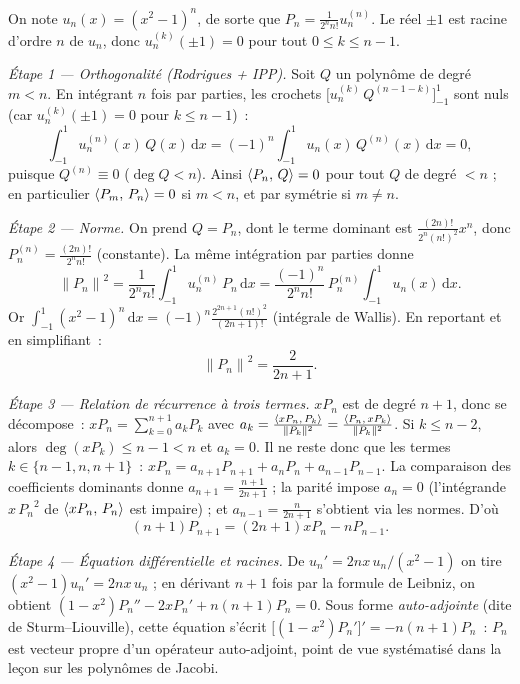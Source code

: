 \begin{mdframed}[style=proofbar]
  On note $u_n(x)={(x^2-1)}^n$, de sorte que $P_n=\frac{1}{2^n n!}u_n^{(n)}$.
  Le réel $\pm 1$ est racine d'ordre $n$ de $u_n$, donc
  $u_n^{(k)}(\pm 1)=0$ pour tout $0\leq k\leq n-1$.

  \medskip
  \textit{Étape 1 — Orthogonalité (Rodrigues + IPP).}
  Soit $Q$ un polynôme de degré $m<n$. En intégrant $n$ fois par parties,
  les crochets $\bigl[u_n^{(k)}\,Q^{(n-1-k)}\bigr]_{-1}^{1}$ sont nuls
  (car $u_n^{(k)}(\pm 1)=0$ pour $k\leq n-1$)~:
  \[
    \int_{-1}^{1} u_n^{(n)}(x)\,Q(x)\,\mathrm{d}x
    = {(-1)}^n \int_{-1}^{1} u_n(x)\,Q^{(n)}(x)\,\mathrm{d}x = 0,
  \]
  puisque $Q^{(n)}\equiv 0$ ($\deg Q<n$). Ainsi $\langle P_n,\,Q\rangle=0$ pour tout
  $Q$ de degré $<n$ ; en particulier $\langle P_m,\,P_n\rangle=0$ si $m<n$, et par
  symétrie si $m\neq n$.

  \medskip
  \textit{Étape 2 — Norme.} On prend $Q=P_n$, dont le terme dominant est
  $\frac{(2n)!}{2^n{(n!)}^2}x^n$, donc $P_n^{(n)}=\frac{(2n)!}{2^n n!}$
  (constante). La même intégration par parties donne
  \[
    {\|P_n\|}^2 = \frac{1}{2^n n!}\int_{-1}^{1} u_n^{(n)}\,P_n\,\mathrm{d}x
    = \frac{{(-1)}^n}{2^n n!}\,P_n^{(n)}\int_{-1}^{1} u_n(x)\,\mathrm{d}x.
  \]
  Or $\int_{-1}^{1}{(x^2-1)}^n\,\mathrm{d}x={(-1)}^n\frac{2^{2n+1}{(n!)}^2}{(2n+1)!}$
  (intégrale de Wallis). En reportant et en simplifiant~:
  \[
    {\|P_n\|}^2 = \frac{2}{2n+1}.
  \]

  \medskip
  \textit{Étape 3 — Relation de récurrence à trois termes.}
  $x P_n$ est de degré $n+1$, donc se décompose~:
  $x P_n=\sum_{k=0}^{n+1} a_k P_k$ avec
  $a_k=\frac{\langle xP_n,\,P_k\rangle}{\|P_k\|^2}=\frac{\langle P_n,\,xP_k\rangle}{\|P_k\|^2}$.
  Si $k\leq n-2$, alors $\deg(xP_k)\leq n-1<n$ et $a_k=0$. Il ne reste donc
  que les termes $k\in\{n-1,n,n+1\}$~:
  $x P_n=a_{n+1}P_{n+1}+a_n P_n+a_{n-1}P_{n-1}$. La comparaison des
  coefficients dominants donne $a_{n+1}=\frac{n+1}{2n+1}$ ; la parité impose
  $a_n=0$ (l'intégrande $x\,{P_n}^2$ de $\langle xP_n,\,P_n\rangle$ est impaire) ;
  et $a_{n-1}=\frac{n}{2n+1}$ s'obtient via les normes. D'où
  \[
    (n+1)P_{n+1}=(2n+1)xP_n-nP_{n-1}.
  \]

  \medskip
  \textit{Étape 4 — Équation différentielle et racines.}
  De $u_n'=2nx\,u_n^{}/(x^2-1)$ on tire
  $(x^2-1)u_n'=2nx\,u_n$ ; en dérivant $n+1$ fois par la formule de Leibniz,
  on obtient $(1-x^2)P_n''-2xP_n'+n(n+1)P_n=0$. Sous forme
  \emph{auto-adjointe} (dite de Sturm--Liouville), cette équation s'écrit
  $\bigl[(1-x^2)P_n'\bigr]'=-n(n+1)P_n$~: $P_n$ est vecteur propre d'un
  opérateur auto-adjoint, point de vue systématisé dans la leçon sur les
  polynômes de Jacobi.


\end{mdframed}
